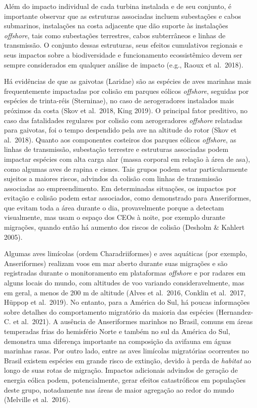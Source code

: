 \documentclass[
  oneside]{scrbook}
\begin{document}
Além do impacto individual de cada turbina instalada e de seu conjunto, é importante observar que as estruturas associadas incluem subestações e cabos submarinos, instalações na costa adjacente que dão suporte às instalações \emph{offshore}, tais como subestações terrestres, cabos subterrâneos e linhas de transmissão. O conjunto dessas estruturas, seus efeitos cumulativos regionais e seus impactos sobre a biodiversidade e funcionamento ecossistêmico devem ser sempre considerados em qualquer análise de impacto (e.g., Raoux et al.~2018).

Há evidências de que as gaivotas (Laridae) são as espécies de aves marinhas mais frequentemente impactadas por colisão em parques eólicos \emph{offshore}, seguidas por espécies de trinta-réis (Sterninae), no caso de aerogeradores instalados mais próximos da costa (Skov et al.~2018, King 2019). O principal fator preditivo, no caso das fatalidades regulares por colisão com aerogeradores \emph{offshore} relatadas para gaivotas, foi o tempo despendido pela ave na altitude do rotor (Skov et al.~2018). Quanto aos componentes costeiros dos parques eólicos \emph{offshore}, as linhas de transmissão, subestação terrestre e estruturas associadas podem impactar espécies com alta carga alar (massa corporal em relação à área de asa), como algumas aves de rapina e cisnes. Tais grupos podem estar particularmente sujeitos a maiores riscos, advindos da colisão com linhas de transmissão associadas ao empreendimento. Em determinadas situações, os impactos por evitação e colisão podem estar associados, como demonstrado para Anseriformes, que evitam toda a área durante o dia, provavelmente porque a detectam visualmente, mas usam o espaço dos CEOs à noite, por exemplo durante migrações, quando então há aumento dos riscos de colisão (Desholm \& Kahlert 2005).

Algumas aves limícolas (ordem Charadriiformes) e aves aquáticas (por exemplo, Anseriformes) realizam voos em mar aberto durante suas migrações e são registradas durante o monitoramento em plataformas \emph{offshore} e por radares em alguns locais do mundo, com altitudes de voo variando consideravelmente, mas em geral, a menos de 200 m de altitude (Alves et al.~2016, Conklin et al.~2017, Hüppop et al.~2019). No entanto, para a América do Sul, há poucas informações sobre detalhes do comportamento migratório da maioria das espécies (Hernandez-C. et al.~2021). A ausência de Anseriformes marinhos no Brasil, comuns em áreas temperadas frias do hemisfério Norte e também no sul da América do Sul, demonstra uma diferença importante na composição da avifauna em águas marinhas rasas. Por outro lado, entre as aves limícolas migratórias ocorrentes no Brasil existem espécies em grande risco de extinção, devido à perda de \emph{habitat} ao longo de suas rotas de migração. Impactos adicionais advindos de geração de energia eólica podem, potencialmente, gerar efeitos catastróficos em populações deste grupo, notadamente nas áreas de maior agregação ao redor do mundo (Melville et al.~2016).
\end{document}
